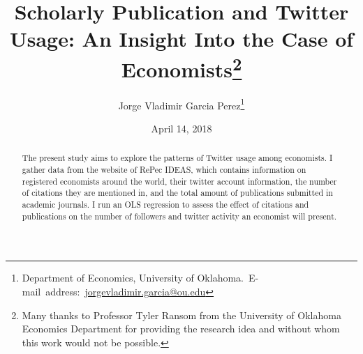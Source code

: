 \documentclass[12pt,english]{article}
\begin{document}
\begin{singlespace}
\title{Scholarly Publication and Twitter Usage: An Insight Into the Case of Economists\thanks{Many thanks to Professor Tyler Ransom from the University of Oklahoma Economics Department for providing the research idea and without whom this work would not be possible. }}
\end{singlespace}

\author{Jorge Vladimir Garcia Perez\thanks{Department of Economics, University of Oklahoma.\
E-mail~address:~\href{mailto:student.name@ou.edu}{jorgevladimir.garcia@ou.edu}}}

\date{April 14, 2018}

\maketitle

\begin{abstract}
\begin{singlespace}
The present study aims to explore the patterns of Twitter usage among economists. I gather data from the website of RePec IDEAS, which contains information on registered economists around the world, their twitter account information, the number of citations they are mentioned in, and the total amount of publications submitted in academic journals. I run an OLS regression to assess the effect of citations and publications on the number of followers and twitter activity an economist will present.   
\end{singlespace}
\end{abstract}
\vfill{}

\pagebreak{}
\end{document}
